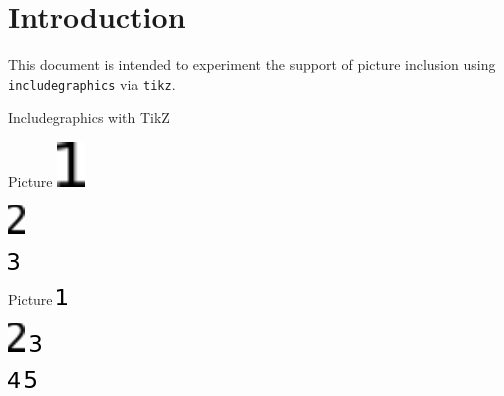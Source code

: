 \documentclass{article}
\begin{document}
\section*{Introduction}

This document is intended to experiment the support of picture inclusion using 
\texttt{includegraphics} via \texttt{tikz}.

\begin{quiz}{Includegraphics with TikZ}

\begin{multi}{Picture}
\includegraphics[width=2em,angle=90]{fig/1.png}
\item* \includegraphics[scale=.5]{fig/2.pdf}
\item \includegraphics{fig/3.png}
\end{multi}

\graphicspath{{./fig/}}
\begin{matching}[dd]{Picture}
\includegraphics{1.png}
\item \includegraphics[angle=45]{2.pdf} \answer \includegraphics{3.png}
\item \includegraphics[angle=-45]{4.png} \answer 
\includegraphics{5.png}
\end{matching}

\end{quiz}
\end{document}
